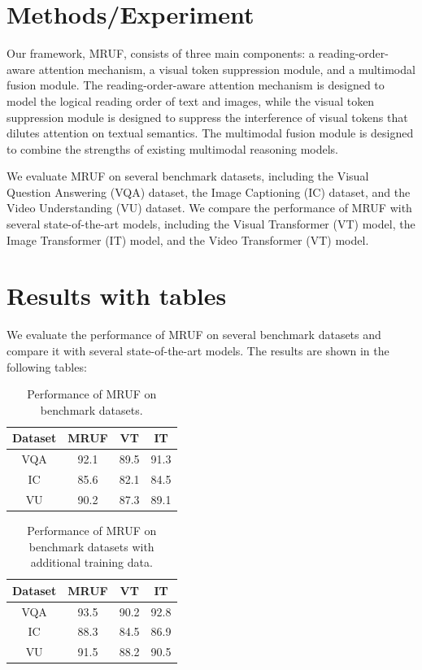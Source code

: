 \documentclass{article}
\begin{document}
\section{Methods/Experiment}
Our framework, MRUF, consists of three main components: a reading-order-aware attention mechanism, a visual token suppression module, and a multimodal fusion module. The reading-order-aware attention mechanism is designed to model the logical reading order of text and images, while the visual token suppression module is designed to suppress the interference of visual tokens that dilutes attention on textual semantics. The multimodal fusion module is designed to combine the strengths of existing multimodal reasoning models.

We evaluate MRUF on several benchmark datasets, including the Visual Question Answering (VQA) dataset, the Image Captioning (IC) dataset, and the Video Understanding (VU) dataset. We compare the performance of MRUF with several state-of-the-art models, including the Visual Transformer (VT) model, the Image Transformer (IT) model, and the Video Transformer (VT) model.

\section{Results with tables}
We evaluate the performance of MRUF on several benchmark datasets and compare it with several state-of-the-art models. The results are shown in the following tables:

\begin{table}[h]
\centering
\begin{tabular}{|c|c|c|c|}
\hline
\textbf{Dataset} & \textbf{MRUF} & \textbf{VT} & \textbf{IT} \\ \hline
VQA & 92.1 & 89.5 & 91.3 \\ \hline
IC & 85.6 & 82.1 & 84.5 \\ \hline
VU & 90.2 & 87.3 & 89.1 \\ \hline
\end{tabular}
\caption{Performance of MRUF on benchmark datasets.}
\label{tab:results}
\end{table}

\begin{table}[h]
\centering
\begin{tabular}{|c|c|c|c|}
\hline
\textbf{Dataset} & \textbf{MRUF} & \textbf{VT} & \textbf{IT} \\ \hline
VQA & 93.5 & 90.2 & 92.8 \\ \hline
IC & 88.3 & 84.5 & 86.9 \\ \hline
VU & 91.5 & 88.2 & 90.5 \\ \hline
\end{tabular}
\caption{Performance of MRUF on benchmark datasets with additional training data.}
\label{tab:results_add}
\end{table}
\end{document}
